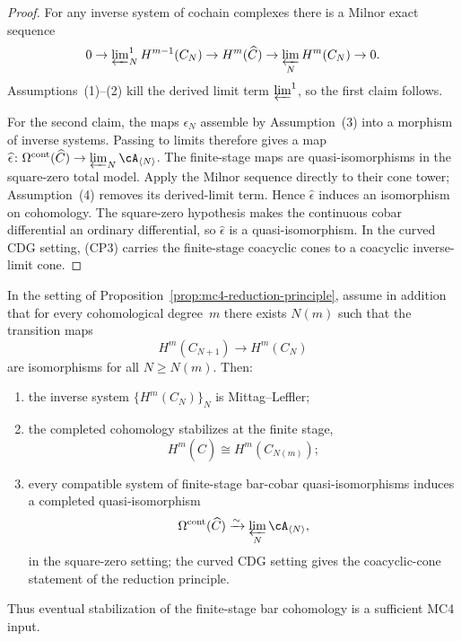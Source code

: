 \begin{proof}
For any inverse system of cochain complexes there is a Milnor exact
sequence
\[
0 \to \varprojlim\nolimits^1_N H^{m-1}(C_N)
\to H^m(\widehat{C})
\to \varprojlim_N H^m(C_N) \to 0.
\]
Assumptions~\textup{(1)}--\textup{(2)} kill the derived limit term
$\varprojlim^1$, so the first claim follows.

For the second claim, the maps $\epsilon_N$ assemble by
Assumption~\textup{(3)} into a morphism of inverse systems. Passing to
limits therefore gives a map
$\widehat{\epsilon}\colon
\Omega^{\mathrm{cont}}(\widehat{C})\to
\varprojlim_N\cA_{\langle N\rangle}$.
The finite-stage maps are quasi-isomorphisms in the square-zero total
model.  Apply the Milnor sequence directly to their cone tower;
Assumption~\textup{(4)} removes its derived-limit term.  Hence
$\widehat{\epsilon}$ induces an isomorphism on cohomology. The
square-zero hypothesis makes the continuous cobar differential an
ordinary differential, so
$\widehat{\epsilon}$ is a quasi-isomorphism. In the curved CDG
setting, \textup{(CP3)} carries the finite-stage coacyclic cones to a
coacyclic inverse-limit cone.
\end{proof}


\begin{corollary}
\label{cor:mc4-degreewise-stabilization}
In the setting of Proposition~\ref{prop:mc4-reduction-principle},
assume in addition that for every cohomological degree~$m$ there exists
$N(m)$ such that the transition maps
\[
H^m(C_{N+1}) \longrightarrow H^m(C_N)
\]
are isomorphisms for all $N \ge N(m)$. Then:
\begin{enumerate}
\item the inverse system $\{H^m(C_N)\}_N$ is Mittag--Leffler;
\item the completed cohomology stabilizes at the finite stage,
 \[
 H^m(\widehat{C}) \cong H^m(C_{N(m)});
 \]
\item every compatible system of finite-stage bar-cobar
 quasi-isomorphisms induces a completed quasi-isomorphism
 \[
 \Omega^{\mathrm{cont}}(\widehat{C})
 \xrightarrow{\sim}
 \varprojlim_N \cA_{\langle N\rangle},
 \]
 in the square-zero setting; the curved CDG setting gives the
 coacyclic-cone statement of the reduction principle.
\end{enumerate}
Thus eventual stabilization of the finite-stage bar cohomology is a
sufficient MC4 input.
\end{corollary}

